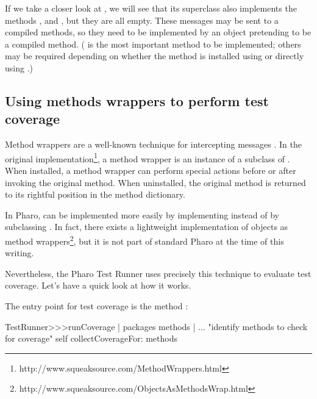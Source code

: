 \documentclass[a4paper,10pt,twoside]{book}
\begin{document}
If we take a closer look at , we will see that its superclass also implements the methods ,  and , but they are all empty.  These messages may be sent to a compiled methods, so they need to be implemented by an object pretending to be a compiled method.  ( is the most important method to be implemented; others may be required depending on whether the method is installed using  or directly using .)

\subsection{Using methods wrappers to perform test coverage}

Method wrappers are a well-known technique for intercepting messages \cite{Bran98a}.
In the original implementation\footnote{http://www.squeaksource.com/MethodWrappers.html}, a method wrapper is an instance of a subclass of . When installed, a method wrapper can perform special actions before or after invoking the original method.
When uninstalled, the original method is returned to its rightful position in the method dictionary.

In Pharo,  can be implemented more easily by implementing  instead of by subclassing . In fact, there exists a lightweight implementation of objects as method wrappers\footnote{http://www.squeaksource.com/ObjectsAsMethodsWrap.html}, but it is not part of standard Pharo at the time of this writing.

Nevertheless, the Pharo Test Runner uses precisely this technique to evaluate test coverage.
Let's have a quick look at how it works.

The entry point for test coverage is the method :
\begin{code}{}
TestRunner>>>runCoverage
        | packages methods |
        ... "identify methods to check for coverage"
        self collectCoverageFor: methods
\end{code}
\end{document}
